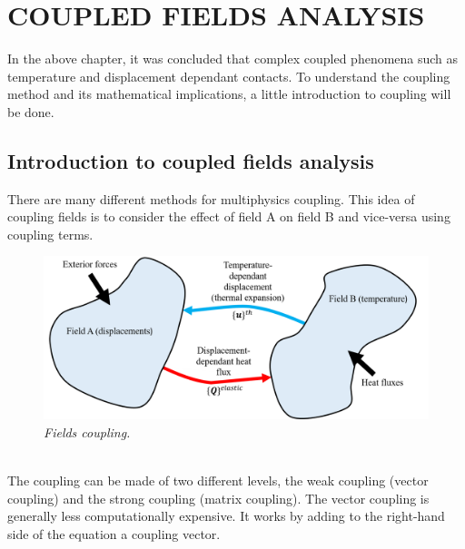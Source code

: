 \section{COUPLED FIELDS ANALYSIS} \label{ch_5.4}
\normalsize{In the above chapter, it was concluded that complex coupled phenomena such as temperature and displacement dependant contacts. To understand the coupling method and its mathematical implications, a little introduction to coupling will be done.}
\subsection{Introduction to coupled fields analysis}
\normalsize{There are many different methods for multiphysics coupling. This idea of coupling fields is to consider the effect of field A on field B and vice-versa using coupling terms.}
\\
\begin{figure}[!ht]
    \label{fig_5_20}
    \centering
    \includegraphics[width=1\textwidth]{figures/patateCoupling.png}
    \caption{\it Fields coupling.}
\end{figure}
\\
\normalsize{The coupling can be made of two different levels, the weak coupling (vector coupling) and the strong coupling (matrix coupling). The vector coupling is generally less computationally expensive. It works by adding to the right-hand side of the equation a coupling vector.}
\\

